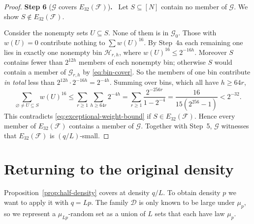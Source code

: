 \documentclass[11pt,letterpaper]{article}
\theoremstyle{definition}
\theoremstyle{remark}
\numberwithin{equation}{section}
\newcommand{\step}[2]{\medskip\noindent\textbf{Step #1} (#2)\textbf{.}\ }
\begin{document}
\begin{proof}
\step{6}{$\mathcal G$ covers $E_{32}(\mathcal F)$}
Let $S\subseteq[N]$ contain no member of $\mathcal G$. We show
$S\notin E_{32}(\mathcal F)$.

Consider the nonempty sets $U\subseteq S$. None of them is in
$\mathcal G_0$. Those with $w(U)=0$ contribute nothing to
$\sum w(U)^{16}$. By Step~4a each remaining one lies in exactly one
nonempty bin $\mathcal H_{r,h}$, where $w(U)^{16}\le2^{-16h}$. Moreover
$S$ contains fewer than $2^{12h}$ members of each nonempty bin; otherwise
$S$ would contain a member of $\mathcal G_{r,h}$ by \eqref{eq:bin-cover}.
So the members of one bin contribute \emph{in total} less than
$2^{12h}\cdot2^{-16h}=2^{-4h}$. Summing over bins, which all have
$h\ge64r$,
\begin{equation}\label{eq:bin-power-sum}
 \sum_{\varnothing\ne U\subseteq S}w(U)^{16}
 \le\sum_{r\ge1}\sum_{h\ge64r}2^{-4h}
 =\sum_{r\ge1}\frac{2^{-256r}}{1-2^{-4}}
 =\frac{16}{15(2^{256}-1)}<2^{-32}.
\end{equation}
This contradicts \eqref{eq:exceptional-weight-bound} if
$S\in E_{32}(\mathcal F)$. Hence every member of $E_{32}(\mathcal F)$
contains a member of $\mathcal G$. Together with Step~5, $\mathcal G$
witnesses that $E_{32}(\mathcal F)$ is $(q/L)$-small.
\end{proof}

\section{Returning to the original density}
\label{sec:density}

Proposition~\ref{prop:half-density} covers at density $q/L$. To obtain
density $p$ we want to apply it with $q=Lp$. The family $\mathcal D$ is
only known to be large under $\mu_p$, so we represent a $\mu_{Lp}$-random
set as a union of $L$ sets that each have law $\mu_p$.
\end{document}
